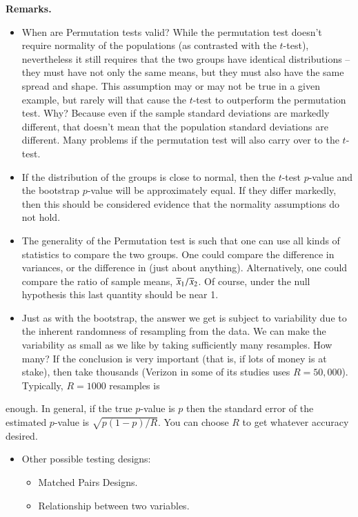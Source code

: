 \documentclass[captions=tableheading]{scrbook}
\begin{document}
 
\textbf{Remarks.}


\begin{itemize}
\item When are Permutation tests valid? While the permutation test doesn't require normality of the populations (as contrasted with the $t$-test), nevertheless it still requires that the two groups have identical distributions -- they must have not only the same means, but they must also have the same spread and shape. This assumption may or may not be true in a given example, but rarely will that cause the $t$-test to outperform the permutation test. Why? Because even if the sample standard deviations are markedly different, that doesn't mean that the population standard deviations are different. Many problems if the permutation test will also carry over to the $t$-test.
\item If the distribution of the groups is close to normal, then the $t$-test $p$-value and the bootstrap $p$-value will be approximately equal. If they differ markedly, then this should be considered evidence that the normality assumptions do not hold.
\item The generality of the Permutation test is such that one can use all kinds of statistics to compare the two groups. One could compare the difference in variances, or the difference in (just about anything). Alternatively, one could compare the ratio of sample means, $\overline{x}_{1}/\overline{x}_{2}$. Of course, under the null hypothesis this last quantity should be near 1.
\item Just as with the bootstrap, the answer we get is subject to variability due to the inherent randomness of resampling from the data. We can make the variability as small as we like by taking sufficiently many resamples. How many? If the conclusion is very important (that is, if lots of money is at stake), then take thousands (Verizon in some of its studies uses $R=50,000$). Typically, $R=1000$ resamples is
\end{itemize}
enough. In general, if the true $p$-value is $p$ then the standard error of the estimated $p$-value is $\sqrt{p(1-p)/R}$. You can choose $R$ to get whatever accuracy desired. 


\begin{itemize}
\item Other possible testing designs:
\begin{itemize}
\item Matched Pairs Designs.
\item Relationship between two variables.
\end{itemize}
\end{itemize}
\end{document}
